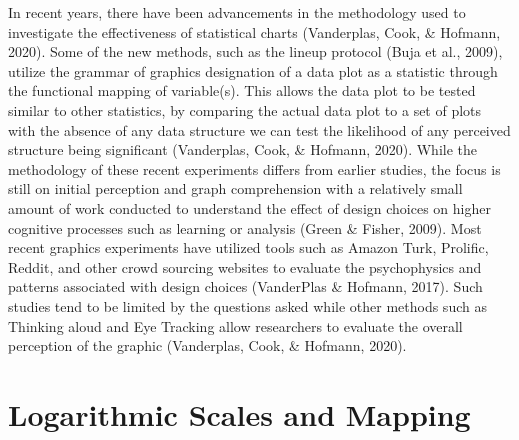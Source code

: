 \documentclass[print]{nuthesis}
\begin{document}
In recent years, there have been advancements in the methodology used to investigate the effectiveness of statistical charts (Vanderplas, Cook, \& Hofmann, 2020).
Some of the new methods, such as the lineup protocol (Buja et al., 2009), utilize the grammar of graphics designation of a data plot as a statistic through the functional mapping of variable(s). 
This allows the data plot to be tested similar to other statistics, by comparing the actual data plot to a set of plots with the absence of any data structure we can test the likelihood of any perceived structure being significant (Vanderplas, Cook, \& Hofmann, 2020).
While the methodology of these recent experiments differs from earlier studies, the focus is still on initial perception and graph comprehension with a relatively small amount of work conducted to understand the effect of design choices on higher cognitive processes such as learning or analysis (Green \& Fisher, 2009). 
Most recent graphics experiments have utilized tools such as Amazon Turk, Prolific, Reddit, and other crowd sourcing websites to evaluate the psychophysics and patterns associated with design choices (VanderPlas \& Hofmann, 2017). Such studies tend to be limited by the questions asked while other methods such as Thinking aloud and Eye Tracking allow researchers to evaluate the overall perception of the graphic (Vanderplas, Cook, \& Hofmann, 2020).

\hypertarget{logarithmic-scales-and-mapping}{%
\section{Logarithmic Scales and Mapping}\label{logarithmic-scales-and-mapping}}
\end{document}
